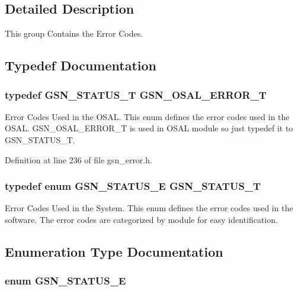 \subsection{Detailed Description}
This group Contains the Error Codes. 

\subsection{Typedef Documentation}
\hypertarget{a00659_ga36216a7aacd1d5024bc7b8bf39c3f46b}{
\subsubsection[{GSN\_\-OSAL\_\-ERROR\_\-T}]{\setlength{\rightskip}{0pt plus 5cm}typedef {\bf GSN\_\-STATUS\_\-T} {\bf GSN\_\-OSAL\_\-ERROR\_\-T}}}
\label{a00659_ga36216a7aacd1d5024bc7b8bf39c3f46b}


Error Codes Used in the OSAL. This enum defines the error codes used in the OSAL. GSN\_\-OSAL\_\-ERROR\_\-T is used in OSAL module so just typedef it to GSN\_\-STATUS\_\-T. 



Definition at line 236 of file gsn\_\-error.h.

\hypertarget{a00659_gae36517c0f5872426a7034c9551eb96ac}{
\subsubsection[{GSN\_\-STATUS\_\-T}]{\setlength{\rightskip}{0pt plus 5cm}typedef enum {\bf GSN\_\-STATUS\_\-E}  {\bf GSN\_\-STATUS\_\-T}}}
\label{a00659_gae36517c0f5872426a7034c9551eb96ac}


Error Codes Used in the System. This enum defines the error codes used in the software. The error codes are categorized by module for easy identification. 



\subsection{Enumeration Type Documentation}
\hypertarget{a00659_ga476ae1caf992f8287176b2cc414c8707}{
\subsubsection[{GSN\_\-STATUS\_\-E}]{\setlength{\rightskip}{0pt plus 5cm}enum {\bf GSN\_\-STATUS\_\-E}}}
\label{a00659_ga476ae1caf992f8287176b2cc414c8707}


